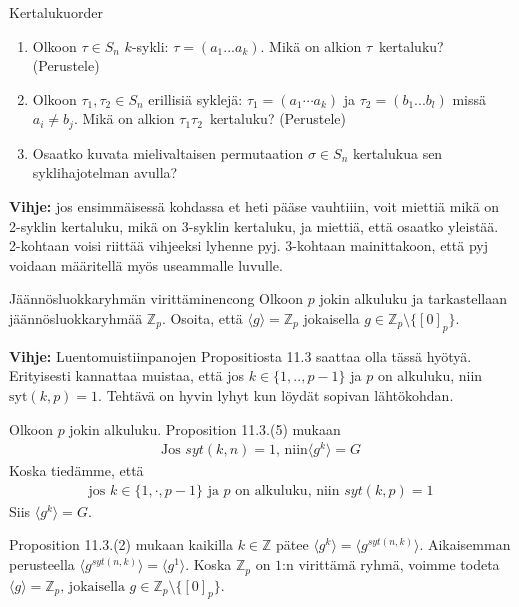 \documentclass[11pt,a4paper]{amsart}
\newcommand{\Z}{\mathbb{Z}}
\newcommand{\1}{\mathbf{1}}
\begin{document}
\begin{Exercises}{Kertaluku}{order}
\begin{enumerate}
\item Olkoon $\tau \in S_n$ $k$-sykli: $\tau=(a_1...a_k)$. Mikä on alkion $\tau$ kertaluku? (Perustele)
\item Olkoon $\tau_1,\tau_2\in S_n$ erillisiä syklejä: $\tau_1=(a_1\cdots a_k)$ ja $\tau_2=(b_1...b_l)$ missä $a_i\neq b_j$. Mikä on alkion $\tau_1\tau_2$ kertaluku? (Perustele)
\item Osaatko kuvata mielivaltaisen permutaation $\sigma\in S_n$ kertalukua sen syklihajotelman avulla?
\end{enumerate}
{\bf Vihje:} jos ensimmäisessä kohdassa et heti pääse vauhtiiin, voit miettiä mikä on 2-syklin kertaluku, mikä on 3-syklin kertaluku, ja miettiä, että osaatko yleistää. 2-kohtaan voisi riittää vihjeeksi lyhenne pyj. 3-kohtaan mainittakoon, että pyj voidaan määritellä myös useammalle luvulle.
\end{Exercises}

\begin{Exercises}{Jäännösluokkaryhmän virittäminen}{cong}
Olkoon $p$ jokin alkuluku ja tarkastellaan jäännösluokkaryhmää $\Z_p$. Osoita, että $\langle g\rangle=\Z_p$ jokaisella $g\in \Z_p\setminus \{[0]_p\}$.

{\bf Vihje:} Luentomuistiinpanojen Propositiosta 11.3 saattaa olla tässä hyötyä. Erityisesti kannattaa muistaa, että jos $k\in \{1,..,p-1\}$ ja $p$ on alkuluku, niin $\mathrm{syt}(k,p)=1$. Tehtävä on hyvin lyhyt kun löydät sopivan lähtökohdan.
\end{Exercises}

\begin{Solution}
  Olkoon $p$ jokin alkuluku. Proposition 11.3.(5) mukaan
  \begin{align*}
    \text{Jos } syt(k,n)=1\text{, niin} \langle g^k \rangle=G
  \end{align*}
  Koska tiedämme, että
  \begin{align*}
    \text{jos } k\in \{1,\cdot,p-1\} \text{ ja } p \text{ on alkuluku, niin } syt(k,p)=1
  \end{align*}
  Siis $\langle g^k \rangle = G$.

  Proposition 11.3.(2) mukaan kaikilla $k\in\mathbb{Z}$ pätee $\langle g^k \rangle=\langle g^{syt(n,k)} \rangle$. Aikaisemman perusteella $\langle g^{syt(n,k)} \rangle=\langle g^1 \rangle$. Koska $\mathbb{Z}_p$ on $1$:n virittämä ryhmä, voimme todeta $\langle g \rangle =\mathbb{Z}_p \text{, jokaisella } g \in \mathbb{Z}_p \setminus \{[0]_p\}$.
\end{Solution}
\end{document}
